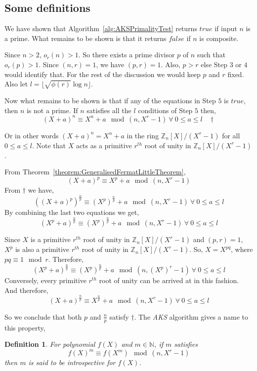 \documentclass[11pt]{article}
\newtheorem{definition}{Definition}[section]
\begin{document}
\subsection{Some definitions}
We have shown that Algorithm~\ref{alg:AKSPrimalityTest} returns $true$ if input $n$ is a prime. What remains to be shown is that it returns $false$ if $n$ is composite.

Since $n > 2$, $o_r(n) > 1$. So there exists a prime divisor $p$ of $n$ such that $o_r(p) > 1$. Since $(n,r) = 1$, we have $(p,r) = 1$. Also, $p > r$ else Step $3$ or $4$ would identify that. For the rest of the discussion we would keep $p$ and $r$ fixed. Also let $l = \lfloor \sqrt{\phi(r)} \log n \rfloor$.

Now what remains to be shown is that if any of the equations in Step $5$ is $true$, then $n$ is not a prime. If $n$ satisfies all the $l$ conditions of Step $5$ then,
\[(X+a)^n \equiv X^n + a \mod (n, X^r - 1)\ \forall\ 0 \leq a \leq l \ \ \ \ \dagger\]

Or in other words $(X+a)^n = X^n + a$ in the ring $\mathbb{Z}_n[X]/(X^r-1)$ for all $0 \leq a \leq l$. Note that $X$ acts as a primitive $r^{th}$ root of unity in $\mathbb{Z}_n[X]/(X^r-1)$.

From Theorem~\ref{theorem:GeneralisedFermatLittleTheorem},
\[(X+a)^p \equiv X^p + a \mod (n,X^r-1)\]
From $\dagger$ we have, 
\[((X+a)^p)^{\frac{n}{p}} \equiv (X^p)^{\frac{n}{p}} + a \mod (n, X^r - 1)\ \forall\ 0 \leq a \leq l \]
By combining the last two equations we get,
\[(X^p+a)^{\frac{n}{p}} \equiv (X^p)^{\frac{n}{p}} + a \mod (n, X^r - 1)\ \forall\ 0 \leq a \leq l \]

Since $X$ is a primitive $r^{th}$ root of unity in $\mathbb{Z}_n[X]/(X^r-1)$ and $(p,r) = 1$, $X^p$ is also a primitive $r^{th}$ root of unity in $\mathbb{Z}_n[X]/(X^r-1)$. So, $X = X^{pq}$, where $pq \equiv 1 \mod r$. Therefore,
\[(X^p+a)^{\frac{n}{p}} \equiv (X^p)^{\frac{n}{p}} + a \mod (n, (X^p)^r - 1)\ \forall\ 0 \leq a \leq l \] Conversely, every primitive $r^{th}$ root of unity can be arrived at in this fashion. And therefore,
\[(X+a)^{\frac{n}{p}} \equiv X^{\frac{n}{p}} + a \mod (n, X^r - 1)\ \forall\ 0 \leq a \leq 
l \]

So we conclude that both $p$ and $\frac{n}{p}$ satisfy $\dagger$. The \emph{AKS} algorithm gives a name to this property,

\begin{definition}
\label{definition:introspective}
For polynomial $f(X)$ and $m \in \mathbb{N}$, if $m$ satisfies
\[f(X)^m \equiv f(X^m) \mod (n,X^r-1)\]
then $m$ is said to be introspective for $f(X)$.
\end{definition}
\end{document}
